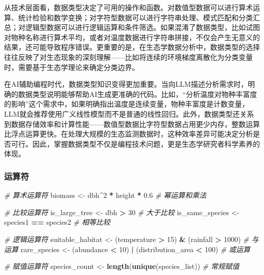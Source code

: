 \documentclass[
]{book}
\newenvironment{Shaded}{\begin{snugshade}}{\end{snugshade}}
\newcommand{\CommentTok}[1]{\textcolor[rgb]{0.56,0.35,0.01}{\textit{#1}}}
\newcommand{\DecValTok}[1]{\textcolor[rgb]{0.00,0.00,0.81}{#1}}
\newcommand{\FloatTok}[1]{\textcolor[rgb]{0.00,0.00,0.81}{#1}}
\newcommand{\FunctionTok}[1]{\textcolor[rgb]{0.13,0.29,0.53}{\textbf{#1}}}
\newcommand{\NormalTok}[1]{#1}
\newcommand{\OtherTok}[1]{\textcolor[rgb]{0.56,0.35,0.01}{#1}}
\newcommand{\SpecialCharTok}[1]{\textcolor[rgb]{0.81,0.36,0.00}{\textbf{#1}}}
\begin{document}
从技术层面看，数据类型决定了可用的操作和函数。对数值型数据可以进行算术运算、统计检验和数学变换；对字符型数据可以进行字符串处理、模式匹配和分类汇总；对逻辑型数据可以进行逻辑运算和条件筛选。如果混淆了数据类型，比如试图对物种名称进行算术平均，或者对温度数据进行字符串拼接，不仅会产生无意义的结果，还可能导致程序错误。更重要的是，在生态学数据分析中，数据类型的选择往往反映了对生态现象的深刻理解------比如将连续的环境梯度离散化为分类变量时，需要基于生态学理论来确定分类边界。

在AI辅助编程时代，数据类型知识变得更加重要。当向LLM描述分析需求时，明确的数据类型说明能够帮助AI生成更准确的代码。比如，``分析温度对物种丰富度的影响''这个需求中，如果明确指出温度是连续变量，物种丰富度是计数变量，LLM就会推荐使用广义线性模型而不是普通的线性回归。此外，数据类型还关系到数据存储效率和计算性能------数值型数据比字符型数据占用更少内存，整数运算比浮点运算更快。在处理大规模的生态监测数据时，这种效率差异可能决定分析是否可行。因此，掌握数据类型不仅是编程技术问题，更是生态学研究者科学素养的体现。

\hypertarget{ux8fd0ux7b97ux7b26}{%
\subsubsection{运算符}\label{ux8fd0ux7b97ux7b26}}

\begin{Shaded}
\begin{Highlighting}[]
\CommentTok{\# 算术运算符}
\NormalTok{biomass }\OtherTok{\textless{}{-}}\NormalTok{ dbh}\SpecialCharTok{\^{}}\DecValTok{2} \SpecialCharTok{*}\NormalTok{ height }\SpecialCharTok{*} \FloatTok{0.6}  \CommentTok{\# 幂运算和乘法}

\CommentTok{\# 比较运算符}
\NormalTok{is\_large\_tree }\OtherTok{\textless{}{-}}\NormalTok{ dbh }\SpecialCharTok{\textgreater{}} \DecValTok{30}  \CommentTok{\# 大于比较}
\NormalTok{is\_same\_species }\OtherTok{\textless{}{-}}\NormalTok{ species1 }\SpecialCharTok{==}\NormalTok{ species2  }\CommentTok{\# 相等比较}

\CommentTok{\# 逻辑运算符}
\NormalTok{suitable\_habitat }\OtherTok{\textless{}{-}}\NormalTok{ (temperature }\SpecialCharTok{\textgreater{}} \DecValTok{15}\NormalTok{) }\SpecialCharTok{\&}\NormalTok{ (rainfall }\SpecialCharTok{\textgreater{}} \DecValTok{1000}\NormalTok{)  }\CommentTok{\# 与运算}
\NormalTok{rare\_species }\OtherTok{\textless{}{-}}\NormalTok{ (abundance }\SpecialCharTok{\textless{}} \DecValTok{10}\NormalTok{) }\SpecialCharTok{|}\NormalTok{ (distribution\_area }\SpecialCharTok{\textless{}} \DecValTok{100}\NormalTok{)  }\CommentTok{\# 或运算}

\CommentTok{\# 赋值运算符}
\NormalTok{species\_count }\OtherTok{\textless{}{-}} \FunctionTok{length}\NormalTok{(}\FunctionTok{unique}\NormalTok{(species\_list))  }\CommentTok{\# 常规赋值}
\end{Highlighting}
\end{Shaded}
\end{document}
